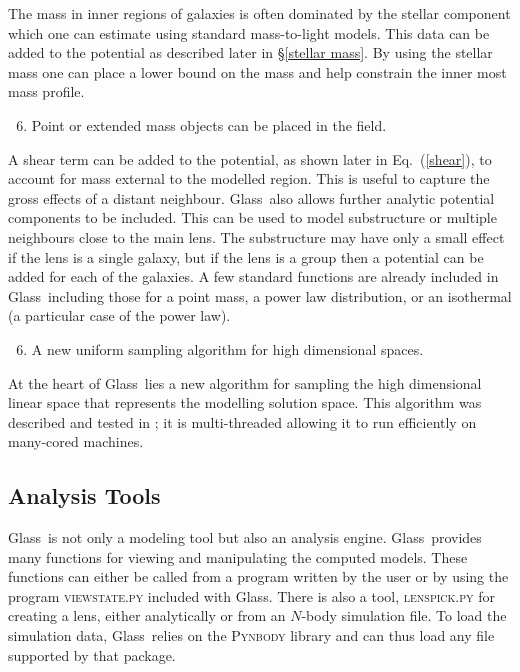 \documentclass[galley,usenatbib]{mn2e}
\newcommand{\Glass}{{\sc Glass}}
\newcommand{\eqnref}[1] {Eq.~(\ref{#1})}
\newcommand{\secref}[1] {\S\ref{#1}}
\begin{document}
%
The mass in inner regions of galaxies is often dominated by the stellar component
which one can estimate using standard mass-to-light models. This data can be added
to the potential as described later in \secref{stellar mass}. By using the stellar
mass one can place a lower bound on the mass and help constrain the inner most
mass profile.
%
\begin{enumerate}
  \setcounter{enumi}{5}
  \item Point or extended mass objects can be placed in the field.
\end{enumerate}
%
A shear term can be added to the potential, as shown later in \eqnref{shear},
to account for mass external to the modelled region. This is useful to capture
the gross effects of a distant neighbour. \Glass\ also allows further analytic
potential components to be included. This can be used to model substructure or
multiple neighbours close to the main lens. The substructure may have only a
small effect if the lens is a single galaxy, but if the lens is a group then a
potential can be added for each of the galaxies. A few standard functions are
already included in \Glass\ including those for a point mass, a power law
distribution, or an isothermal (a particular case of the power law).
%
\begin{enumerate}
  \setcounter{enumi}{5}
  \item A new uniform sampling algorithm for high dimensional spaces.
\end{enumerate}
%
At the heart of \Glass\ lies a new algorithm for sampling the high dimensional
linear space that represents the modelling solution space. This algorithm was
described and tested in \cite{2012MNRAS.425.3077L}; it is multi-threaded
allowing it to run efficiently on many-cored machines.  

\subsection{Analysis Tools}\label{sec:tools}
\Glass\ is not only a modeling tool but also an analysis engine. \Glass\
provides many functions for viewing and manipulating the computed models.
These functions can either be called from a program written by the user or by
using the program \textsc{viewstate.py} included with \Glass. There is also a
tool, \textsc{lenspick.py} for creating a lens, either analytically or from an
$N$-body simulation file. To load the simulation data, \Glass\ relies on the
\textsc{Pynbody} library \citep{pynbody} and can thus load any file supported
by that package.
\end{document}
